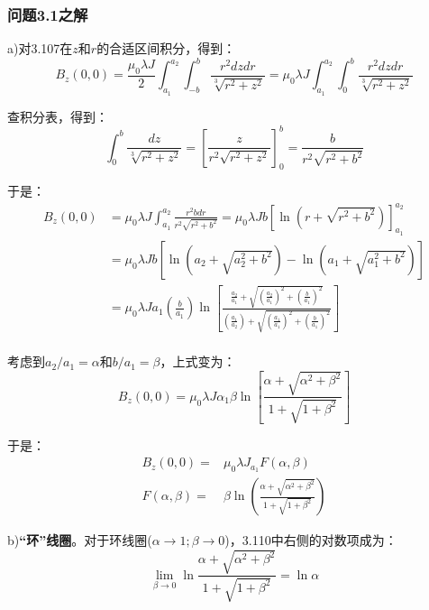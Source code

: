 \subsubsection{问题3.1之解}

a)对3.107在$z$和$r$的合适区间积分，得到：
\begin{equation*}
B_z(0,0)=\frac{\mu_0\lambda J}{2}\int_{a_1}^{a_2}\int_{-b}^{b}\frac{r^2dzdr}{\sqrt[3]{r^2+z^2}}=\mu_0\lambda J\int_{a_1}^{a_2}\int_{0}^{b}\frac{r^2dzdr}{\sqrt[3]{r^2+z^2}}%
\end{equation*}

查积分表，得到：
\begin{equation*}
\int_{0}^{b}\frac{dz}{\sqrt[3]{r^2+z^2}}=\left[\frac{z}{r^2\sqrt{r^2+z^2}}\right]_{0}^{b}=\frac{b}{r^2\sqrt{r^2+b^2}}%
\end{equation*}

于是：
\begin{equation*}
\begin{split}
B_z(0,0)&=\mu_0\lambda J\int_{a_1}^{a_2}\frac{r^2bdr}{r^2\sqrt{r^2+b^2}}=\mu_0\lambda Jb[\ln({r+\sqrt{r^2+b^2}})]_{a_1}^{a_2}\\
&=\mu_0\lambda Jb[\ln(a_2+\sqrt{a_2^2+b^2})-\ln(a_1+\sqrt{a_1^2+b^2})]\\
&=\mu_0\lambda Ja_1\left(\frac{b}{a_1}\right)\ln\left[\frac{\frac{a_2}{a_1}+\sqrt{(\frac{a_2}{a_1})^2+(\frac{b}{a_1})^2}}{(\frac{a_1}{a_2})+\sqrt{(\frac{a_1}{a_1})^2+(\frac{b}{a_1})^2}}\right]\\%
\end{split} \tag{S1.1}
\end{equation*}

考虑到$a_2/a_1=\alpha$和$b/a_1=\beta$，上式变为：
\begin{equation*}
B_z(0,0)=\mu_0\lambda J\alpha_1\beta\ln\left[\frac{\alpha+\sqrt{\alpha^2+\beta^2}}{1+\sqrt{1+\beta^2}}\right]\tag{S1.2}
\end{equation*}

于是：
\begin{align*}
B_z(0,0)=&\mu_0\lambda J_{a_1}F(\alpha,\beta)\tag{3.109}\\ %
F(\alpha,\beta)=&\beta \ln\left(\frac{\alpha+\sqrt{\alpha^2+\beta^2}}{1+\sqrt{1+\beta^2}}\right)\tag{3.13b}%
\end{align*}

b)\textbf{“环”线圈}。对于环线圈($\alpha\rightarrow 1; \beta\rightarrow 0$)，3.110中右侧的对数项成为：
\begin{equation*}
\lim_{\beta\rightarrow 0}\ln\frac{\alpha+\sqrt{\alpha^2+\beta^2}}{1+\sqrt{1+\beta^2}}=\ln\alpha%
\end{equation*}

